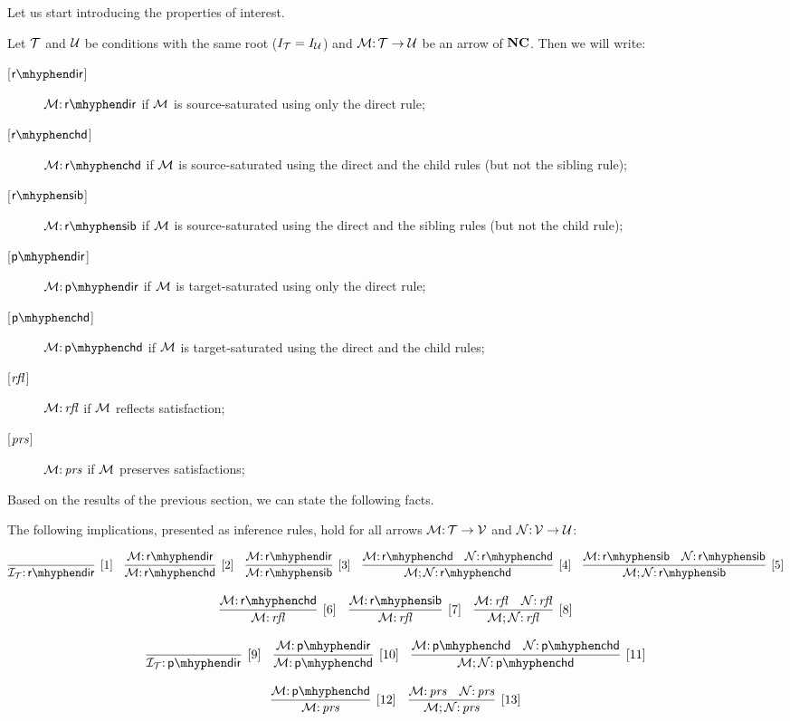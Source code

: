 Let us start introducing the properties of interest.

\begin{definition}
\label{def:properties}
\end{definition}
Let ${\mathcal{T}}$ and ${\mathcal{U}}$ be conditions with the same root ($I_{\mathcal{T}}=I_{\mathcal{U}}$) and ${\mathcal{M}} {:}\, {\mathcal{T}} \rightarrow {\mathcal{U}}$ be an arrow of $\mathbf{NC}$. Then we will write:

\begin{description}
    \item[{[$\rdir$]}] $\cM \of \rdir$ if ${\mathcal{M}}$ is source-saturated using only the  direct rule;
    \item [{[$\rchd$]}] $\cM \of \rchd$ if ${\mathcal{M}}$ is source-saturated using the  direct and the child rules (but not the sibling rule);
    \item  [{[$\rsib$]}] $\cM \of \rsib$ if ${\mathcal{M}}$ is source-saturated using the  direct and the sibling rules (but not the child rule);
    \item [{[$\pdir$]}] $\cM \of \pdir$ if ${\mathcal{M}}$ is target-saturated using only the  direct rule;
    \item [{[$\pchd$]}] $\cM \of \pchd$ if ${\mathcal{M}}$ is target-saturated using the  direct and the child rules;
    \item [{[$\mathit{rfl}$]}] ${\mathcal{M}} {:}\, \mathit{rfl}$ if ${\mathcal{M}}$ reflects satisfaction;
    \item [{[$\mathit{prs}$]}] ${\mathcal{M}} {:}\, \mathit{prs}$ if ${\mathcal{M}}$ preserves satisfactions;
\end{description}

Based on the results of the previous section, we can state the following facts.

\begin{proposition}
The following implications, presented as inference rules, hold for all arrows ${\mathcal{M}} {:}\,{\mathcal{T}} \rightarrow {\mathcal{V}}$ and ${\mathcal{N}}{:}\, {\mathcal{V}} \rightarrow {\mathcal{U}}$: 

$$\infer[{[1]}]{\cI_\cT \of \rdir}{} \quad \infer[{[2]}]{\cM\of \rchd}{\cM\of \rdir} \quad \infer[{[3]}]{\cM\of \rsib}{\cM\of \rdir} \quad \infer[{[4]}]{\cM;\cN\of \rchd}{\cM\of \rchd & \cN \of \rchd}  \quad \infer[{[5]}]{\cM;\cN\of \rsib}{\cM\of \rsib & \cN \of \rsib} $$

$$\infer[{[6]}]{\cM\of \rfl}{\cM\of \rchd} \quad \infer[{[7]}]{\cM\of \rfl}{\cM\of \rsib} \quad \infer[{[8]}]{\cM;\cN\of \rfl}{\cM\of \rfl & \cN \of \rfl} $$ 

$$\infer[{[9]}]{\cI_\cT \of \pdir}{} \quad \infer[{[10]}]{\cM\of \pchd}{\cM\of \pdir} \quad 
\infer[{[11]}]{\cM;\cN\of \pchd}{\cM\of \pchd & \cN \of \pchd}  $$

$$\infer[{[12]}]{\cM\of \prs}{\cM\of \pchd} \quad
\infer[{[13]}]{\cM;\cN\of \prs}{\cM\of \prs & \cN \of \prs} $$ 
\end{proposition} 

